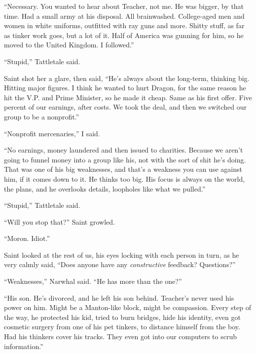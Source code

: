 ``Necessary.  You wanted to hear about Teacher, not me.  He was bigger, by that time.  Had a small army at his disposal.  All brainwashed.  College-aged men and women in white uniforms, outfitted with ray guns and more.  Shitty stuff, as far as tinker work goes, but a lot of it.  Half of America was gunning for him, so he moved to the United Kingdom.  I followed.''



``Stupid,'' Tattletale said.



Saint shot her a glare, then said, ``He's always about the long-term, thinking big.  Hitting major figures.  I think he wanted to hurt Dragon, for the same reason he hit the V.P. and Prime Minister, so he made it cheap.  Same as his first offer.  Five percent of our earnings, after costs.  We took the deal, and then we switched our group to be a nonprofit.''



``Nonprofit mercenaries,'' I said.



``No earnings, money laundered and then issued to charities.  Because we aren't going to funnel money into a group like his, not with the sort of shit he's doing.  That was one of his big weaknesses, and that's a weakness you can use against him, if it comes down to it.  He thinks too big.  His focus is always on the world, the plans, and he overlooks details, loopholes like what we pulled.''



``Stupid,'' Tattletale said.



``Will you stop that?''  Saint growled.



``Moron.  Idiot.''



Saint looked at the rest of us, his eyes locking with each person in turn, as he very calmly said, ``Does anyone have any \emph{constructive} feedback?  Questions?''



``Weaknesses,'' Narwhal said.  ``He has more than the one?''



``His son.  He's divorced, and he left his son behind.  Teacher's never used his power on him.  Might be a Manton-like block, might be compassion.  Every step of the way, he protected his kid, tried to burn bridges, hide his identity, even got cosmetic surgery from one of his pet tinkers, to distance himself from the boy.  Had his thinkers cover his tracks.  They even got into our computers to scrub information.''



